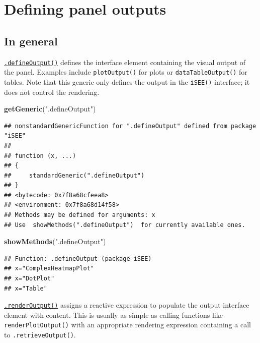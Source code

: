\documentclass[
]{book}
\newenvironment{Shaded}{\begin{snugshade}}{\end{snugshade}}
\newcommand{\KeywordTok}[1]{\textcolor[rgb]{0.13,0.29,0.53}{\textbf{#1}}}
\newcommand{\NormalTok}[1]{#1}
\newcommand{\StringTok}[1]{\textcolor[rgb]{0.31,0.60,0.02}{#1}}
\begin{document}
\hypertarget{defining-panel-outputs}{%
\section{Defining panel outputs}\label{defining-panel-outputs}}

\hypertarget{in-general-1}{%
\subsection{In general}\label{in-general-1}}

\href{https://isee.github.io/iSEE/reference/output-generics.html}{\texttt{.defineOutput()}} defines the interface element containing the visual output of the panel.
Examples include \texttt{plotOutput()} for plots or \texttt{dataTableOutput()} for tables.
Note that this generic only defines the output in the \texttt{iSEE()} interface; it does not control the rendering.

\begin{Shaded}
\begin{Highlighting}[]
\KeywordTok{getGeneric}\NormalTok{(}\StringTok{".defineOutput"}\NormalTok{)}
\end{Highlighting}
\end{Shaded}

\begin{verbatim}
## nonstandardGenericFunction for ".defineOutput" defined from package "iSEE"
## 
## function (x, ...) 
## {
##     standardGeneric(".defineOutput")
## }
## <bytecode: 0x7f8a68cfeea8>
## <environment: 0x7f8a68d14f58>
## Methods may be defined for arguments: x
## Use  showMethods(".defineOutput")  for currently available ones.
\end{verbatim}

\begin{Shaded}
\begin{Highlighting}[]
\KeywordTok{showMethods}\NormalTok{(}\StringTok{".defineOutput"}\NormalTok{)}
\end{Highlighting}
\end{Shaded}

\begin{verbatim}
## Function: .defineOutput (package iSEE)
## x="ComplexHeatmapPlot"
## x="DotPlot"
## x="Table"
\end{verbatim}

\href{https://isee.github.io/iSEE/reference/output-generics.html}{\texttt{.renderOutput()}} assigns a reactive expression to populate the output interface element with content.
This is usually as simple as calling functions like \texttt{renderPlotOutput()} with an appropriate rendering expression containing a call to \texttt{.retrieveOutput()}.
\end{document}
